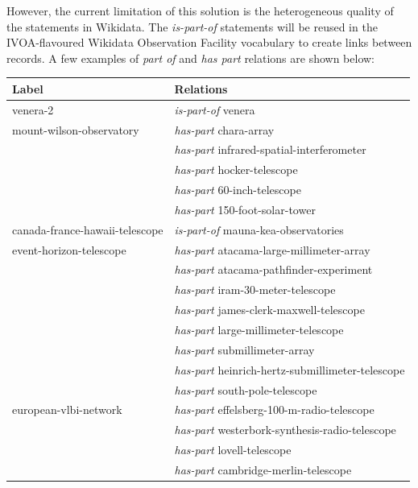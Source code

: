 \documentclass[11pt,a4paper]{ivoa}
\begin{document}
However, the current limitation of this solution is the heterogeneous 
quality of the statements in Wikidata. The \emph{is-part-of} 
statements will be reused in the IVOA-flavoured Wikidata Observation 
Facility vocabulary to create links between records. A few examples of 
\emph{part of} and \emph{has part} relations are shown below:
{\small \noindent\begin{longtable}{p{}p{}}
\textbf{Label} & \textbf{Relations}\\
\hline
\hline
venera-2  & \emph{is-part-of} venera\\
\hline
mount-wilson-observatory & \emph{has-part} chara-array\\
                         & \emph{has-part} infrared-spatial-interferometer\\
                         & \emph{has-part} hocker-telescope\\
                         & \emph{has-part} 60-inch-telescope\\
                         & \emph{has-part} 150-foot-solar-tower\\
\hline
canada-france-hawaii-telescope & \emph{is-part-of} mauna-kea-observatories\\
\hline
event-horizon-telescope & \emph{has-part} atacama-large-millimeter-array\\
                        & \emph{has-part} atacama-pathfinder-experiment\\
                        & \emph{has-part} iram-30-meter-telescope\\
                        & \emph{has-part} james-clerk-maxwell-telescope\\
                        & \emph{has-part} large-millimeter-telescope\\
                        & \emph{has-part} submillimeter-array\\
                        & \emph{has-part} heinrich-hertz-submillimeter-telescope\\
                        & \emph{has-part} south-pole-telescope\\
\hline
european-vlbi-network   & \emph{has-part} effelsberg-100-m-radio-telescope\\
                        & \emph{has-part} westerbork-synthesis-radio-telescope\\
                        & \emph{has-part} lovell-telescope\\
                        & \emph{has-part} cambridge-merlin-telescope\\

\end{longtable}}
\end{document}
